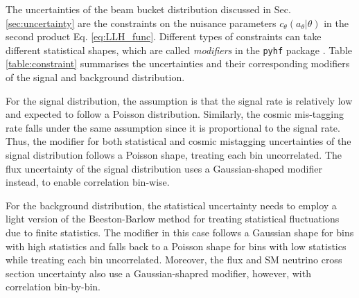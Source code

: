The uncertainties of the beam bucket distribution discussed in Sec. \ref{sec:uncertainty} are the constraints on the nuisance parameters $c_\theta(a_\theta|\theta)$ in the second product Eq. \ref{eq:LLH_func}.
Different types of constraints can take different statistical shapes, which are called \textit{modifiers} in the \texttt{pyhf} package \cite{pyhf, pyhf_joss}.
Table \ref{table:constraint} summarises the uncertainties and their corresponding modifiers of the signal and background distribution.


For the signal distribution, the assumption is that the signal rate is relatively low and expected to follow a Poisson distribution.
Similarly, the cosmic mis-tagging rate falls under the same assumption since it is proportional to the signal rate. 
Thus, the modifier for both statistical and cosmic mistagging uncertainties of the signal distribution follows a Poisson shape, treating each bin uncorrelated. 
The flux uncertainty of the signal distribution uses a Gaussian-shaped modifier instead, to enable correlation bin-wise.

For the background distribution, the statistical uncertainty needs to employ a light version of the Beeston-Barlow method \cite{BeestonBarlow} for treating statistical fluctuations due to finite statistics.
The modifier in this case follows a Gaussian shape for bins with high statistics and falls back to a Poisson shape for bins with low statistics while treating each bin uncorrelated.                                            
Moreover, the flux and SM neutrino cross section uncertainty also use a Gaussian-shapred modifier, however, with correlation bin-by-bin.

